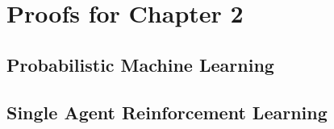 \documentclass{report}
\begin{document}
% 



\chapter{Proofs for Chapter 2}

\section {Probabilistic Machine Learning}


\section {Single Agent Reinforcement Learning}


% 
\end{document}
